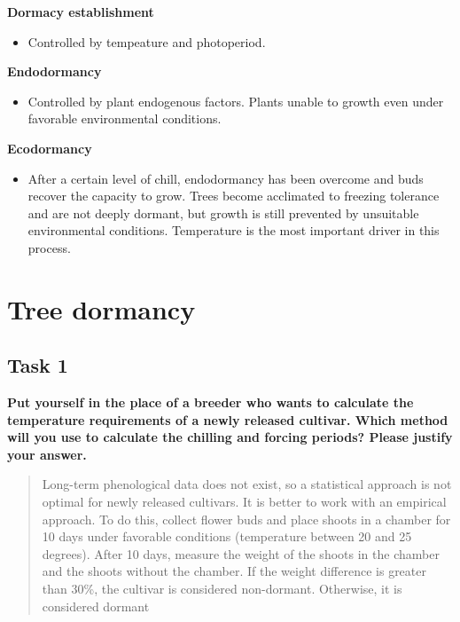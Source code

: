 \documentclass[
]{book}
\providecommand{\tightlist}{%
  \setlength{\itemsep}{0pt}\setlength{\parskip}{0pt}}
\begin{document}
\textbf{Dormacy establishment}

\begin{itemize}
\tightlist
\item
  Controlled by tempeature and photoperiod.
\end{itemize}

\textbf{Endodormancy}

\begin{itemize}
\tightlist
\item
  Controlled by plant endogenous factors. Plants unable to growth even under
  favorable environmental conditions.
\end{itemize}

\textbf{Ecodormancy}

\begin{itemize}
\tightlist
\item
  After a certain level of chill, endodormancy has been overcome and buds recover the capacity to grow. Trees become acclimated to freezing tolerance and are not deeply dormant, but growth is still prevented by unsuitable environmental conditions. Temperature is the most important driver in this process.
\end{itemize}

\hypertarget{treedormancy}{%
\chapter{Tree dormancy}\label{treedormancy}}

\hypertarget{task-1}{%
\section{Task 1}\label{task-1}}

\textbf{Put yourself in the place of a breeder who wants to calculate the temperature requirements of a newly released cultivar. Which method will you use to calculate the chilling and forcing periods? Please justify your answer.}

\begin{quote}
Long-term phenological data does not exist, so a statistical approach is not optimal for newly released cultivars. It is better to work with an empirical approach. To do this, collect flower buds and place shoots in a chamber for 10 days under favorable conditions (temperature between 20 and 25 degrees). After 10 days, measure the weight of the shoots in the chamber and the shoots without the chamber. If the weight difference is greater than 30\%, the cultivar is considered non-dormant. Otherwise, it is considered dormant
\end{quote}
\end{document}
